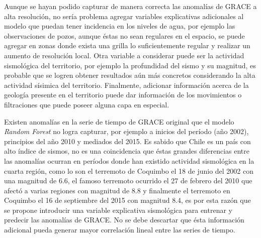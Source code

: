 Aunque se hayan podido capturar de manera correcta las anomalías de GRACE a alta resolución, no sería problema agregar variables explicativas adicionales al modelo que puedan tener incidencia en los niveles de agua, por ejemplo las observaciones de pozos, aunque éstas no sean regulares en el espacio, se puede
agregar en zonas donde exista una grilla lo suficientemente regular y realizar un aumento de resolución local. Otra variable a considerar puede ser la actividad sismológica del territorio, por ejemplo la profundidad del sismo y su magnitud, es probable que se logren obtener resultados aún más concretos considerando la 
alta actividad sísimica del territorio. Finalmente, adicionar información acerca de la geología presente en el territorio puede dar información de los movimientos o filtraciones que puede poseer alguna capa en especial. 

Existen anomalías en la serie de tiempo de GRACE original que el modelo \textit{Random Forest} no logra capturar, por ejemplo a inicios del período (año 2002), principios del año 2010 y mediados del 2015. Es sabido que Chile es un país con alto índice de sismos, no es una coincidencia que éstas grandes diferencias entre las anomalías ocurran 
en períodos donde han existido actividad sismológica en la cuarta región, como lo son el terremoto de Coquimbo el 18 de junio del 2002 con una magnitud de 6.6, el famoso terremoto ocurrido el 27 de febrero del 2010 que afectó a varias regiones con magnitud de 8.8 y finalmente el terremoto en Coquimbo el 16 de septiembre del 2015 con magnitud 8.4,
es por esta razón que se propone introducir una variable explicativa sismológica para entrenar y predecir las anomalías de GRACE. No se debe descartar que ésta información adicional pueda generar mayor correlación lineal entre las series de tiempo.

% 

%
%